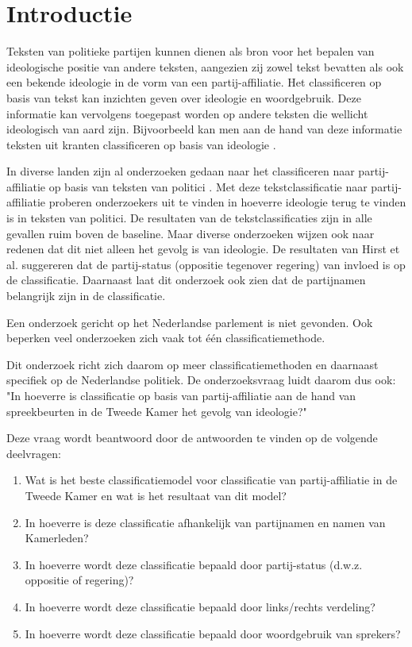 \section{Introductie}
\label{sec:intro}
Teksten van politieke partijen kunnen dienen als bron voor het bepalen van ideologische positie van andere teksten, aangezien zij zowel tekst bevatten als ook een bekende ideologie in de vorm van een partij-affiliatie. Het classificeren op basis van tekst kan inzichten geven over ideologie en woordgebruik. Deze informatie kan vervolgens toegepast worden op andere teksten die wellicht ideologisch van aard zijn. Bijvoorbeeld kan men aan de hand van deze informatie teksten uit kranten classificeren op basis van ideologie \cite{DBLP:journals/corr/Biessmann16,Hirst_textto}.\par
In diverse landen zijn al onderzoeken gedaan naar het classificeren naar partij-affiliatie op basis van teksten van politici \cite{Ferreira2016UsingTT,DBLP:journals/corr/Biessmann16}. Met deze tekstclassificatie naar partij-affiliatie proberen onderzoekers uit te vinden in hoeverre ideologie terug te vinden is in teksten van politici. De resultaten van de tekstclassificaties zijn in alle gevallen ruim boven de baseline. Maar diverse onderzoeken wijzen ook naar redenen dat dit niet alleen het gevolg is van ideologie. De resultaten van Hirst et al. \cite{Hirst_textto} suggereren dat de partij-status (oppositie tegenover regering) van invloed is op de classificatie. Daarnaast laat dit onderzoek ook zien dat de partijnamen belangrijk zijn in de classificatie.\par
Een onderzoek gericht op het Nederlandse parlement is niet gevonden. Ook beperken veel onderzoeken zich vaak tot één classificatiemethode.\par
Dit onderzoek richt zich daarom op meer classificatiemethoden en daarnaast specifiek op de Nederlandse politiek. De onderzoeksvraag luidt daarom dus ook: "In hoeverre is classificatie op basis van partij-affiliatie aan de hand van spreekbeurten in de Tweede Kamer het gevolg van ideologie?"\par
Deze vraag wordt beantwoord door de antwoorden te vinden op de volgende deelvragen:
\begin{enumerate}
    \item Wat is het beste classificatiemodel voor classificatie van partij-affiliatie in de Tweede Kamer en wat is het resultaat van dit model?
    \item In hoeverre is deze classificatie afhankelijk van partijnamen en namen van Kamerleden?
    \item In hoeverre wordt deze classificatie bepaald door partij-status (d.w.z. oppositie of regering)?
    \item In hoeverre wordt deze classificatie bepaald door links/rechts verdeling?
    \item In hoeverre wordt deze classificatie bepaald door woordgebruik van sprekers?
\end{enumerate}

